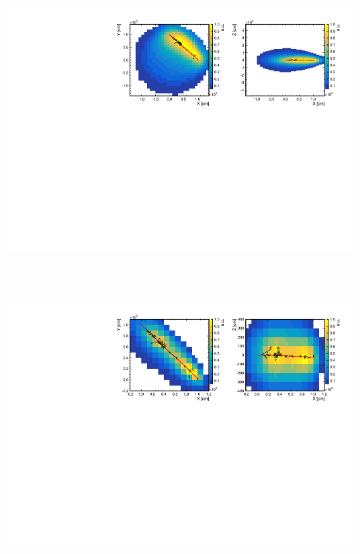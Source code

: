 \begin{figure}[b!t]
  \centering
  \begin{subfigure}[t]{0.99\textwidth}     
    \includegraphics[trim=0.1cm 0.1cm 0.0cm 0.1cm,clip=true,width=\textwidth]
      {./recon/RecoResult0.pdf}
  \end{subfigure}
  ~
    \begin{subfigure}[t]{0.99\textwidth}     
    \includegraphics[trim=0.1cm 0.1cm 0.0cm 0.1cm,clip=true,width=\textwidth]
      {./recon/RecoResult8.pdf}
  \end{subfigure}
  ~
  \begin{subfigure}[t]{0.99\textwidth}

\end{subfigure}
\end{figure}
